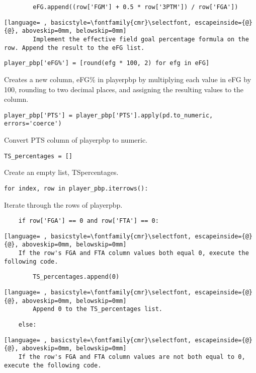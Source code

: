 \documentclass{article}
\begin{document}
\begin{lstlisting}
        eFG.append((row['FGM'] + 0.5 * row['3PTM']) / row['FGA'])
\end{lstlisting}
\begin{lstlisting}[language= , basicstyle=\fontfamily{cmr}\selectfont, escapeinside={@}{@}, aboveskip=0mm, belowskip=0mm]
        Implement the effective field goal percentage formula on the row. Append the result to the eFG list.
\end{lstlisting}
\begin{lstlisting}
player_pbp['eFG%'] = [round(efg * 100, 2) for efg in eFG]
\end{lstlisting}
Creates a new column, eFG\% in player\textunderscore pbp by multiplying each value in eFG by 100, rounding to two decimal places, and assigning the resulting values to the column.
\begin{lstlisting}
player_pbp['PTS'] = player_pbp['PTS'].apply(pd.to_numeric, errors='coerce')
\end{lstlisting}
Convert PTS column of player\textunderscore pbp to numeric.
\begin{lstlisting}
TS_percentages = []
\end{lstlisting}
Create an empty list, TS\textunderscore percentages.
\begin{lstlisting}
for index, row in player_pbp.iterrows():
\end{lstlisting}
Iterate through the rows of player\textunderscore pbp.
\begin{lstlisting}
    if row['FGA'] == 0 and row['FTA'] == 0:
\end{lstlisting}
\begin{lstlisting}[language= , basicstyle=\fontfamily{cmr}\selectfont, escapeinside={@}{@}, aboveskip=0mm, belowskip=0mm]
    If the row's FGA and FTA column values both equal 0, execute the following code.
\end{lstlisting}
\begin{lstlisting}
        TS_percentages.append(0)
\end{lstlisting}
\begin{lstlisting}[language= , basicstyle=\fontfamily{cmr}\selectfont, escapeinside={@}{@}, aboveskip=0mm, belowskip=0mm]
        Append 0 to the TS_percentages list.
\end{lstlisting}
\begin{lstlisting}
    else:
\end{lstlisting}
\begin{lstlisting}[language= , basicstyle=\fontfamily{cmr}\selectfont, escapeinside={@}{@}, aboveskip=0mm, belowskip=0mm]
    If the row's FGA and FTA column values are not both equal to 0, execute the following code.
\end{lstlisting}
\end{document}
